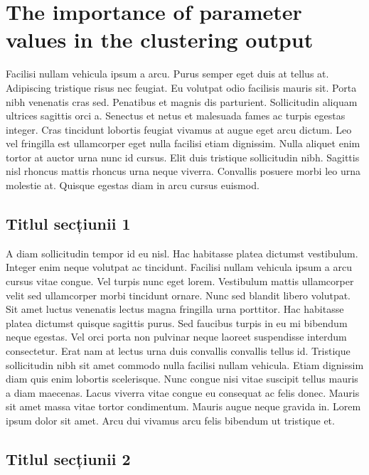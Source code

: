 \chapter{The importance of parameter values in the clustering output}
Facilisi nullam vehicula ipsum a arcu. Purus semper eget duis at tellus at. Adipiscing tristique risus nec feugiat. Eu volutpat odio facilisis mauris sit. Porta nibh venenatis cras sed. Penatibus et magnis dis parturient. Sollicitudin aliquam ultrices sagittis orci a. Senectus et netus et malesuada fames ac turpis egestas integer. Cras tincidunt lobortis feugiat vivamus at augue eget arcu dictum. Leo vel fringilla est ullamcorper eget nulla facilisi etiam dignissim. Nulla aliquet enim tortor at auctor urna nunc id cursus. Elit duis tristique sollicitudin nibh. Sagittis nisl rhoncus mattis rhoncus urna neque viverra. Convallis posuere morbi leo urna molestie at. Quisque egestas diam in arcu cursus euismod.

\section{Titlul secțiunii 1}

A diam sollicitudin tempor id eu nisl. Hac habitasse platea dictumst vestibulum. Integer enim neque volutpat ac tincidunt. Facilisi nullam vehicula ipsum a arcu cursus vitae congue. Vel turpis nunc eget lorem. Vestibulum mattis ullamcorper velit sed ullamcorper morbi tincidunt ornare. Nunc sed blandit libero volutpat. Sit amet luctus venenatis lectus magna fringilla urna porttitor. Hac habitasse platea dictumst quisque sagittis purus. Sed faucibus turpis in eu mi bibendum neque egestas. Vel orci porta non pulvinar neque laoreet suspendisse interdum consectetur. Erat nam at lectus urna duis convallis convallis tellus id. Tristique sollicitudin nibh sit amet commodo nulla facilisi nullam vehicula. Etiam dignissim diam quis enim lobortis scelerisque. Nunc congue nisi vitae suscipit tellus mauris a diam maecenas. Lacus viverra vitae congue eu consequat ac felis donec. Mauris sit amet massa vitae tortor condimentum. Mauris augue neque gravida in. Lorem ipsum dolor sit amet. Arcu dui vivamus arcu felis bibendum ut tristique et.

\section{Titlul secțiunii 2}

